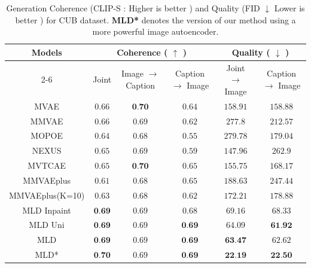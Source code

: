 \begin{table}[H]
\tiny
\centering
\begin{tabular}{c|c|cc|cc}
\toprule
\multirow{2}{*}{ Models }  & \multicolumn{3}{c}{ Coherence ( $ \uparrow $ ) }  &  \multicolumn{2}{c}{Quality ( $ \downarrow $ ) }  \\
    \cmidrule{2-6}
    &  Joint &Image $\rightarrow$ Caption &  Caption $\rightarrow$ Image & Joint $\rightarrow$ Image & Caption $\rightarrow$ Image \\
    \midrule
    
    \gls{MVAE} & $0.66$&$\textbf{0.70}$ &$0.64$ & 
    $158.91$ &  $158.88$
\\
  \gls{MMVAE} & $0.66$&$0.69$ &$0.62$ & 
    $277.8$ &  $212.57$   \\
    \gls{MOPOE} & $0.64$&$0.68$ &$0.55$ & 
    $279.78$ &  $179.04$ \\
    
   \gls{NEXUS} & $0.65$&$0.69$ &$0.59$ & 
    $147.96$ &  $262.9$ \\ 
 

   \gls{MVTCAE} &$0.65$&$\textbf{0.70}$ &$0.65$ & 
    $155.75$ &  $168.17$ \\
     \gls{MMVAEplus} &$0.61$&$0.68$ &$0.65$ & 
    $188.63$ &  $247.44$
    \\

     \gls{MMVAEplus}(K=10) &  $0.63$&$0.68$ &$0.62$ & 
    $172.21$ &  $178.88$  
   \\
    \midrule
   \gls{MLD Inpaint} & $\textbf{0.69}$&${0.69}$ &${0.68}$ & 
    ${69.16}$ &  ${68.33}$
    \\
  \gls{MLD Uni}  &$ \textbf{0.69}$&${0.69}$ &$\textbf{0.69}$ & 
    $64.09$ &  $\textbf{61.92}$ \\

    \gls{MLD}  &$ \textbf{0.69}$&$0.69$ &$\textbf{0.69}$ & 
    $\textbf{63.47}$ &  $62.62$ \\
 \midrule
 \gls{MLD}*  &$ \textbf{0.70}$&
 $0.69$ &
 $\textbf{0.69}$ & 
    $\textbf{22.19}$ & 
    $\textbf{22.50}$ \\
 
    \bottomrule

\end{tabular}
\caption{Generation Coherence (\gls{CLIP-S}  : Higher is better ) and Quality (\gls{FID} $\downarrow$ Lower is better ) for CUB dataset. \textbf{\gls{MLD}*} denotes the version of our method using a more powerful image autoencoder.}
\label{coh_qua:cub}

 \end{table}

